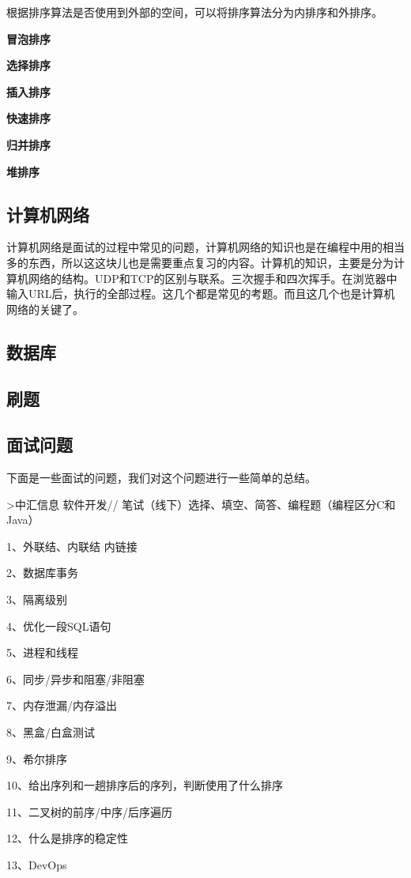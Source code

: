 \documentclass[UTF8]{ctexart}
\begin{document}
根据排序算法是否使用到外部的空间，可以将排序算法分为内排序和外排序。


\textbf{冒泡排序}


\textbf{选择排序}


\textbf{插入排序}


\textbf{快速排序}


\textbf{归并排序}


\textbf{堆排序}

\subsection{计算机网络}

计算机网络是面试的过程中常见的问题，计算机网络的知识也是在编程中用的相当多的东西，所以这这块儿也是需要重点复习的内容。计算机的知识，主要是分为计算机网络的结构。UDP和TCP的区别与联系。三次握手和四次挥手。在浏览器中输入URL后，执行的全部过程。这几个都是常见的考题。而且这几个也是计算机网络的关键了。

\subsection{数据库}
\subsection{刷题}


\subsection{面试问题}
下面是一些面试的问题，我们对这个问题进行一些简单的总结。

>中汇信息 软件开发// 笔试（线下）选择、填空、简答、编程题（编程区分C和Java）

1、外联结、内联结
内链接

2、数据库事务

3、隔离级别

4、优化一段SQL语句

5、进程和线程

6、同步/异步和阻塞/非阻塞

7、内存泄漏/内存溢出

8、黑盒/白盒测试

9、希尔排序

10、给出序列和一趟排序后的序列，判断使用了什么排序

11、二叉树的前序/中序/后序遍历

12、什么是排序的稳定性

13、DevOps
\end{document}
